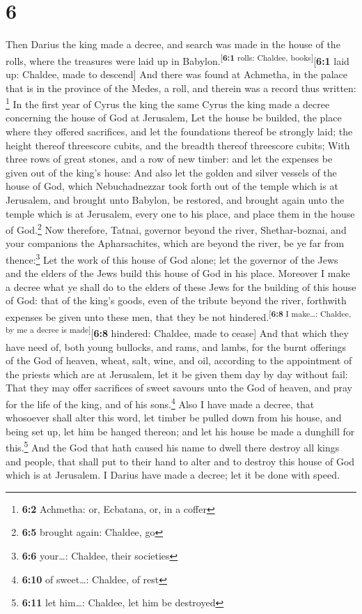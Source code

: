 \hypertarget{section-5}{%
\section{6}\label{section-5}}

 Then Darius the king made a decree, and search was made
in the house of the rolls, where the treasures were laid up in
Babylon.\textsuperscript{{[}\textbf{6:1} rolls: Chaldee,
books{]}}{[}\textbf{6:1} laid up: Chaldee, made to descend{]}
 And there was found at Achmetha, in the palace that is in
the province of the Medes, a roll, and therein was a record thus
written: \footnote{\textbf{6:2} Achmetha: or, Ecbatana, or, in a coffer}
 In the first year of Cyrus the king the same Cyrus the
king made a decree concerning the house of God at Jerusalem, Let the
house be builded, the place where they offered sacrifices, and let the
foundations thereof be strongly laid; the height thereof threescore
cubits, and the breadth thereof threescore cubits;  With
three rows of great stones, and a row of new timber: and let the
expenses be given out of the king's house:  And also let
the golden and silver vessels of the house of God, which Nebuchadnezzar
took forth out of the temple which is at Jerusalem, and brought unto
Babylon, be restored, and brought again unto the temple which is at
Jerusalem, every one to his place, and place them in the house of
God.\footnote{\textbf{6:5} brought again: Chaldee, go} 
Now therefore, Tatnai, governor beyond the river, Shethar-boznai, and
your companions the Apharsachites, which are beyond the river, be ye far
from thence:\footnote{\textbf{6:6} your\ldots: Chaldee, their societies}
 Let the work of this house of God alone; let the governor
of the Jews and the elders of the Jews build this house of God in his
place.  Moreover I make a decree what ye shall do to the
elders of these Jews for the building of this house of God: that of the
king's goods, even of the tribute beyond the river, forthwith expenses
be given unto these men, that they be not
hindered.\textsuperscript{{[}\textbf{6:8} I make\ldots: Chaldee, by me a
decree is made{]}}{[}\textbf{6:8} hindered: Chaldee, made to cease{]}
 And that which they have need of, both young bullocks,
and rams, and lambs, for the burnt offerings of the God of heaven,
wheat, salt, wine, and oil, according to the appointment of the priests
which are at Jerusalem, let it be given them day by day without fail:
 That they may offer sacrifices of sweet savours unto the
God of heaven, and pray for the life of the king, and of his
sons.\footnote{\textbf{6:10} of sweet\ldots: Chaldee, of rest}
 Also I have made a decree, that whosoever shall alter
this word, let timber be pulled down from his house, and being set up,
let him be hanged thereon; and let his house be made a dunghill for
this.\footnote{\textbf{6:11} let him\ldots: Chaldee, let him be
  destroyed}  And the God that hath caused his name to
dwell there destroy all kings and people, that shall put to their hand
to alter and to destroy this house of God which is at Jerusalem. I
Darius have made a decree; let it be done with speed.

